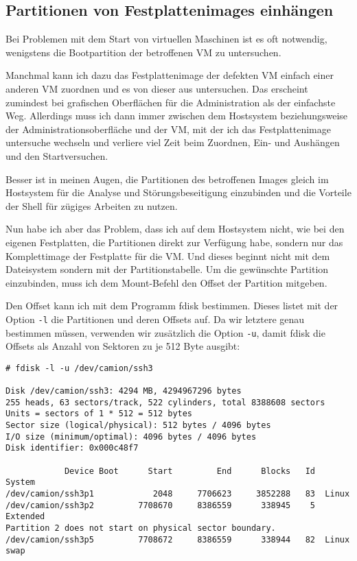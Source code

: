 \subsection*{Partitionen von Festplattenimages einhängen}
\label{sec:mount-hdimage-partition}

Bei Problemen mit dem Start von virtuellen Maschinen ist es oft notwendig,
wenigstens die Bootpartition der betroffenen VM zu untersuchen.

Manchmal kann
ich dazu das Festplattenimage der defekten VM einfach einer anderen VM
zuordnen und es von dieser aus untersuchen. Das erscheint zumindest bei
grafischen Oberflächen für die Administration als der einfachste Weg.
Allerdings muss ich dann immer zwischen dem Hostsystem beziehungsweise der
Administrationsoberfläche und der VM, mit der ich das Festplattenimage
untersuche wechseln und verliere viel Zeit beim Zuordnen, Ein- und Aushängen
und den Startversuchen.

Besser ist in meinen Augen, die Partitionen des betroffenen Images gleich im
Hostsystem für die Analyse und Störungsbeseitigung einzubinden und die
Vorteile der Shell für zügiges Arbeiten zu nutzen.

Nun habe ich aber das Problem, dass ich auf dem Hostsystem nicht, wie bei den
eigenen Festplatten, die Partitionen direkt zur Verfügung habe, sondern nur
das Komplettimage der Festplatte für die VM. Und dieses beginnt nicht mit dem
Dateisystem sondern mit der Partitionstabelle. Um die gewünschte Partition
einzubinden, muss ich dem Mount-Befehl den Offset der Partition mitgeben.

Den Offset kann ich mit dem Programm fdisk bestimmen. Dieses listet mit der
Option \verb?-l? die Partitionen und deren Offsets auf. Da wir letztere genau
bestimmen müssen, verwenden wir zusätzlich die Option \verb?-u?, damit fdisk
die Offsets als Anzahl von Sektoren zu je 512 Byte ausgibt:

\begin{verbatim}
# fdisk -l -u /dev/camion/ssh3 

Disk /dev/camion/ssh3: 4294 MB, 4294967296 bytes
255 heads, 63 sectors/track, 522 cylinders, total 8388608 sectors
Units = sectors of 1 * 512 = 512 bytes
Sector size (logical/physical): 512 bytes / 4096 bytes
I/O size (minimum/optimal): 4096 bytes / 4096 bytes
Disk identifier: 0x000c48f7

            Device Boot      Start         End      Blocks   Id  System
/dev/camion/ssh3p1            2048     7706623     3852288   83  Linux
/dev/camion/ssh3p2         7708670     8386559      338945    5  Extended
Partition 2 does not start on physical sector boundary.
/dev/camion/ssh3p5         7708672     8386559      338944   82  Linux swap
\end{verbatim}

